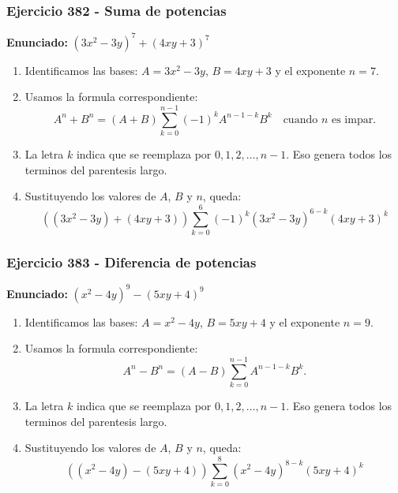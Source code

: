\documentclass[11pt,a4paper]{article}
\begin{document}
\subsubsection*{Ejercicio 382 - Suma de potencias}
\textbf{Enunciado:} $ \left(3 x^{2} - 3 y\right)^{7}+\left(4 x y + 3\right)^{7} $\par
\begin{enumerate}[leftmargin=2em]
\item Identificamos las bases: \(A=3 x^{2} - 3 y\), \(B=4 x y + 3\) y el exponente \(n=7\).
\item Usamos la formula correspondiente: \[A^n+B^n=(A+B)\sum_{k=0}^{n-1}(-1)^kA^{n-1-k}B^k\quad\text{cuando }n\text{ es impar}.\]
\item La letra \(k\) indica que se reemplaza por \(0,1,2,\ldots,n-1\). Eso genera todos los terminos del parentesis largo.
\item Sustituyendo los valores de \(A\), \(B\) y \(n\), queda: \[\boxed{\left(\left(3 x^{2} - 3 y\right)+\left(4 x y + 3\right)\right)\sum_{k=0}^{6}(-1)^k\left(3 x^{2} - 3 y\right)^{6-k}\left(4 x y + 3\right)^k}\]
\end{enumerate}

\vspace{0.2cm}
\subsubsection*{Ejercicio 383 - Diferencia de potencias}
\textbf{Enunciado:} $ \left(x^{2} - 4 y\right)^{9}-\left(5 x y + 4\right)^{9} $\par
\begin{enumerate}[leftmargin=2em]
\item Identificamos las bases: \(A=x^{2} - 4 y\), \(B=5 x y + 4\) y el exponente \(n=9\).
\item Usamos la formula correspondiente: \[A^n-B^n=(A-B)\sum_{k=0}^{n-1}A^{n-1-k}B^k.\]
\item La letra \(k\) indica que se reemplaza por \(0,1,2,\ldots,n-1\). Eso genera todos los terminos del parentesis largo.
\item Sustituyendo los valores de \(A\), \(B\) y \(n\), queda: \[\boxed{\left(\left(x^{2} - 4 y\right)-\left(5 x y + 4\right)\right)\sum_{k=0}^{8}\left(x^{2} - 4 y\right)^{8-k}\left(5 x y + 4\right)^k}\]
\end{enumerate}

\vspace{0.2cm}
\end{document}
